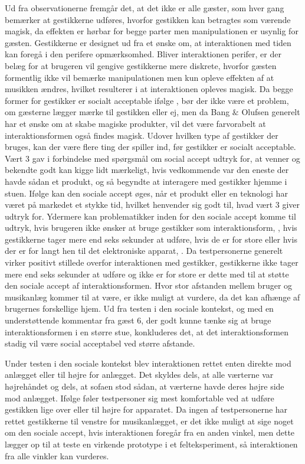 Ud fra observationerne fremgår det, at det ikke er alle gæster, som hver gang bemærker at gestikkerne udføres, hvorfor gestikken kan betragtes som værende magisk, da effekten er hørbar for begge parter men manipulationen er usynlig for gæsten. Gestikkerne er designet ud fra et ønske om, at interaktionen med tiden kan foregå i den perifere opmærksomhed. Bliver interaktionen perifer, er der belæg for at brugeren vil gengive gestikkerne mere diskrete, hvorfor gæsten formentlig ikke vil bemærke manipulationen men kun opleve effekten af at musikken ændres, hvilket resulterer i at interaktionen opleves magisk. Da begge former for gestikker er socialt acceptable ifølge \textcite[s. 277]{PDF:WouldYouDoThat}, bør der ikke være et problem, om gæsterne lægger mærke til gestikken eller ej, men da Bang $\&$ Olufsen generelt har et ønske om at skabe magiske produkter, vil det være farvorabelt at interaktionsformen også findes magisk.\blankline
%
Udover hvilken type af gestikker der bruges, kan der være flere ting der spiller ind, før gestikker er socialt acceptable. Vært 3 gav i forbindelse med spørgsmål om social accept udtryk for, at venner og bekendte godt kan kigge lidt mærkeligt, hvis vedkommende var den eneste der havde sådan et produkt, og så begyndte at interagere med gestikker hjemme i stuen. Ifølge \textcite[s. 276]{PDF:WouldYouDoThat} kan den sociale accept øges, når et produkt eller en teknologi har været på markedet et stykke tid, hvilket henvender sig godt til, hvad vært 3 giver udtryk for. Ydermere kan problematikker inden for den sociale accept komme til udtryk, hvis brugeren ikke ønsker at bruge gestikker som interaktionsform, \parencite[s. 276]{PDF:WouldYouDoThat}, hvis gestikkerne tager mere end seks sekunder at udføre, hvis de er for store eller hvis der er for langt hen til det elektroniske apparat, \parencite[s. 199]{PDF:AreYouComfortableDoingThat}. Da testpersonerne generelt virker positivt stillede overfor interaktionen med gestikker, gestikkerne ikke tager mere end seks sekunder at udføre og ikke er for store er dette med til at støtte den sociale accept af interaktionsformen. Hvor stor afstanden mellem bruger og musikanlæg kommer til at være, er ikke muligt at vurdere, da det kan afhænge af brugernes forskellige hjem. Ud fra testen i den sociale kontekst, og med en understøttende kommentar fra gæst 6, der godt kunne tænke sig at bruge interaktionsformen i en større stue, konkluderes det, at det interaktionsformen stadig vil være social acceptabel ved større afstande.  

Under testen i den sociale kontekst blev interaktionen rettet enten direkte mod anlægget eller til højre for anlægget. Det skyldes dels, at alle værterne var højrehåndet og dels, at sofaen stod sådan, at værterne havde deres højre side mod anlægget. Ifølge \textcite[s. 197]{PDF:AreYouComfortableDoingThat} føler testpersoner sig mest komfortable ved at udføre gestikken lige over eller til højre for apparatet. Da ingen af testpersonerne har rettet gestikkerne til venstre for musikanlægget, er det ikke muligt at sige noget om den sociale accept, hvis interaktionen foregår fra en anden vinkel, men dette lægger op til at teste en virkende prototype i et felteksperiment, så interaktionen fra alle vinkler kan vurderes. \blankline 
